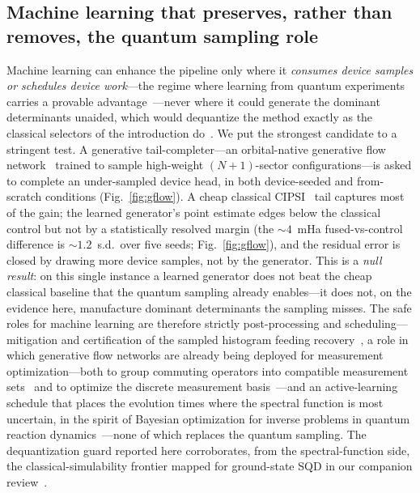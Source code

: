 \subsection{Machine learning that preserves, rather than removes, the quantum sampling role}
Machine learning can enhance the pipeline only where it \emph{consumes device samples or schedules
device work}---the regime where learning from quantum experiments carries a provable
advantage~\cite{huang2022}---never where it could generate the dominant determinants unaided, which
would dequantize the method exactly as the classical selectors of the introduction
do~\cite{belagali2026,hinqs2026,review}. We put the strongest candidate to a stringent test. A
generative tail-completer---an orbital-native generative flow network~\cite{bengio2021}
trained to sample high-weight $(N{+}1)$-sector configurations---is asked to complete an under-sampled
device head, in both device-seeded and from-scratch conditions (Fig.~\ref{fig:gflow}). A cheap
classical CIPSI~\cite{cipsi1973} tail captures most of the gain; the learned generator's point estimate
edges below the classical control but not by a statistically resolved margin (the $\sim\!4$~mHa
fused-vs-control difference is $\sim\!1.2$~s.d.\ over five seeds; Fig.~\ref{fig:gflow}), and the residual
error is closed by drawing more device samples, not by the generator. This is a
\emph{null result}: on this single instance a learned generator does not beat the cheap classical baseline
that the quantum sampling already enables---it does not, on the evidence here, manufacture dominant
determinants the sampling misses. The safe roles for machine learning are therefore strictly
post-processing and scheduling---mitigation and certification of the sampled histogram feeding
recovery~\cite{qesem2025,algorithmiq2026}, a role in which generative flow networks are already being
deployed for measurement optimization---both to group commuting operators into compatible measurement
sets~\cite{vargashernandez2024} and to optimize the discrete measurement
basis~\cite{vargashernandez2025}---and an active-learning schedule that
places the evolution times where the spectral function is most uncertain, in the spirit of Bayesian
optimization for inverse problems in quantum reaction dynamics~\cite{vargashernandez2019}---none of which replaces the quantum
sampling. The dequantization guard reported here corroborates, from the spectral-function side, the
classical-simulability frontier mapped for ground-state SQD in our companion review~\cite{review}.

